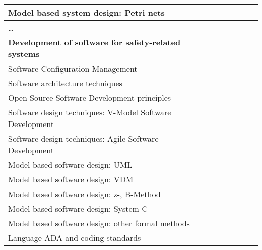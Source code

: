 \documentclass[a4paper, 11pt]{article}
\begin{document}
\begin{center}
\begin{longtable}{|r|r|r|r|r|r|r|r|}
    \hline
    \multicolumn{1}{|l|}{Model based system design: Petri nets} & \multicolumn{1}{c|}{} &       &       &       &       &       &  \bigstrut\\
    \hline
    \multicolumn{1}{|l|}{…} & \multicolumn{1}{c|}{} &       &       &       &       &       &  \bigstrut[t]\\
    \multicolumn{1}{|l|}{\textbf{Development of software for safety-related systems}} & \multicolumn{1}{l|}{\textbf{}} &       &       &       &       &       &  \\
    \multicolumn{1}{|l|}{Software Configuration Management} & \multicolumn{1}{l|}{} &       &       &       &       &       &  \bigstrut[b]\\
    \hline
    \multicolumn{1}{|l|}{Software architecture techniques} & \multicolumn{1}{l|}{} &       &       &       &       &       &  \bigstrut\\
    \hline
    \multicolumn{1}{|l|}{Open Source Software Development principles} & \multicolumn{1}{l|}{} &       &       &       &       &       &  \bigstrut\\
    \hline
    \multicolumn{1}{|l|}{Software design techniques: V-Model Software Development} & \multicolumn{1}{l|}{} &       &       &       &       &       &  \bigstrut\\
    \hline
    \multicolumn{1}{|l|}{Software design techniques: Agile Software Development} & \multicolumn{1}{l|}{} &       &       &       &       &       &  \bigstrut\\
    \hline
    \multicolumn{1}{|l|}{Model based software design: UML} & \multicolumn{1}{l|}{} &       &       &       &       &       &  \bigstrut\\
    \hline
    \multicolumn{1}{|l|}{Model based software design: VDM} & \multicolumn{1}{l|}{} &       &       &       &       &       &  \bigstrut\\
    \hline
    \multicolumn{1}{|l|}{Model based software design: z-, B-Method} & \multicolumn{1}{l|}{} &       &       &       &       &       &  \bigstrut\\
    \hline
    \multicolumn{1}{|l|}{Model based software design: System C} & \multicolumn{1}{l|}{} &       &       &       &       &       &  \bigstrut\\
    \hline
    \multicolumn{1}{|l|}{Model based software design: other formal methods} & \multicolumn{1}{l|}{} &       &       &       &       &       &  \bigstrut\\
    \hline
    \multicolumn{1}{|l|}{Language ADA and coding standards} & \multicolumn{1}{l|}{} &       &       &       &       &       &  \bigstrut\\

\end{longtable}
\end{center}
\end{document}
